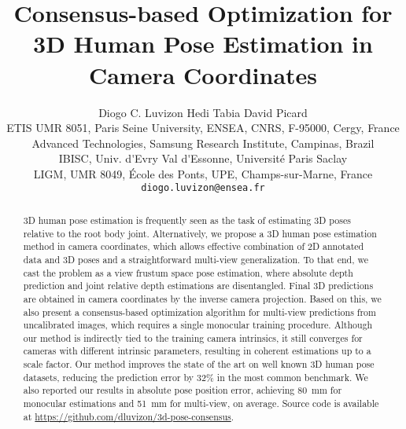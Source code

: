 \documentclass[10pt,twocolumn,letterpaper]{article}
\newcommand{\revb}[1]{{#1}}
\begin{document}
\title{Consensus-based Optimization for 3D Human Pose Estimation in Camera Coordinates}

\author{Diogo C. Luvizon \hspace{1cm}  Hedi Tabia  \hspace{1cm} David Picard
\vspace{0.254cm}\\
ETIS UMR 8051, Paris Seine University, ENSEA, CNRS, F-95000, Cergy, France\\
Advanced Technologies, Samsung Research Institute, Campinas, Brazil\\
IBISC, Univ. d\'{}Evry Val d\'{}Essonne, Universit\'{e} Paris Saclay\\
LIGM, UMR 8049, \'{E}cole des Ponts, UPE, Champs-sur-Marne, France\\
{\tt\small diogo.luvizon@ensea.fr}
}

\maketitle


\begin{abstract}
  3D human pose estimation is frequently seen as the task of estimating
  3D poses relative to the root body joint.
  Alternatively, we propose a 3D human pose estimation method in camera coordinates, which allows effective combination of 2D
  annotated data and 3D poses \revb{and} a straightforward multi-view generalization.
  To that end, we cast the problem \revb{as a view frustum space pose estimation,
  where absolute depth prediction and joint relative depth estimations are disentangled.
  Final 3D predictions are obtained in camera coordinates by the inverse camera projection.}
  Based on this, \revb{we also present a consensus-based optimization algorithm for multi-view predictions} from uncalibrated images, which requires a single monocular training procedure.
  \revb{Although our method is indirectly tied to the training camera intrinsics, it still converges for cameras with different intrinsic parameters, resulting in coherent estimations up to a scale factor.}
  Our method improves the state of the art on well known 3D human pose
  datasets, reducing the prediction error by 32\% in the most common benchmark.
  We also reported our results in absolute pose position error,
  achieving 80~mm for monocular estimations and 51~mm for multi-view, on average.
  Source code is available at \url{https://github.com/dluvizon/3d-pose-consensus}.
\end{abstract}
\end{document}
